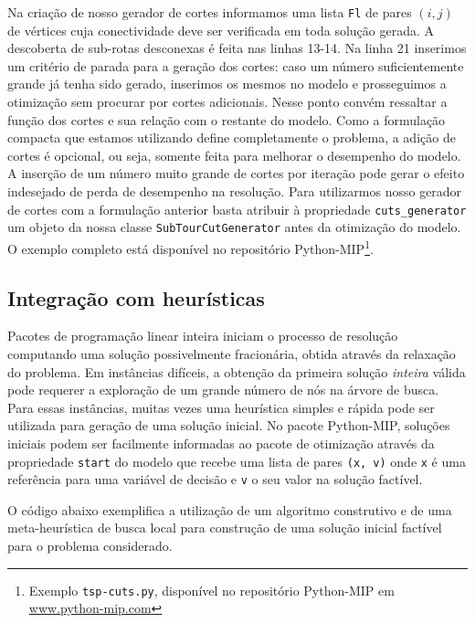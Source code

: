 \documentclass[a4paper,11pt,fleqn]{article}
\begin{document}
Na criação de nosso gerador de cortes informamos uma lista \texttt{Fl} de pares $(i,j)$ de vértices cuja conectividade deve ser verificada em toda solução gerada. A descoberta de sub-rotas desconexas é feita nas linhas 13-14. Na linha 21 inserimos um critério de parada para a geração dos cortes: caso um número suficientemente grande já tenha sido gerado, inserimos os mesmos no modelo e prosseguimos a otimização sem procurar por cortes adicionais. Nesse ponto convém ressaltar a função dos cortes e sua relação com o restante do modelo. Como a formulação compacta que estamos utilizando define completamente o problema, a adição de cortes é opcional, ou seja, somente feita para melhorar o desempenho do modelo. A inserção de um número muito grande de cortes por iteração pode gerar o efeito indesejado de perda de desempenho na resolução. Para utilizarmos nosso gerador de cortes com a formulação anterior basta atribuir à propriedade \texttt{cuts\_generator} um objeto da nossa classe \texttt{SubTourCutGenerator} antes da otimização do modelo. O exemplo completo está disponível no repositório Python-MIP\footnote{Exemplo \texttt{tsp-cuts.py}, disponível no repositório Python-MIP em \url{www.python-mip.com}}.

\subsection{Integração com heurísticas}

Pacotes de programação linear inteira iniciam o processo de resolução computando uma solução possivelmente fracionária, obtida através da relaxação do problema. Em instâncias difíceis, a obtenção da primeira solução \emph{inteira} válida pode requerer a exploração de um grande número de nós na árvore de busca. Para essas instâncias, muitas vezes uma heurística simples e rápida pode ser utilizada para geração de uma solução inicial. No pacote Python-MIP, soluções iniciais podem ser facilmente informadas ao pacote de otimização através da propriedade \texttt{start} do modelo que recebe uma lista de pares \texttt{(x, v)} onde \texttt{x} é uma referência para uma variável de decisão e \texttt{v} o seu valor na solução factível. 

O código abaixo exemplifica a utilização de um algoritmo construtivo e de uma meta-heurística de busca local para construção de uma solução inicial factível para o problema considerado.
 
\end{document}
